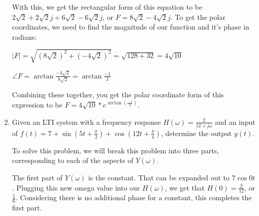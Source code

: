 \documentclass[12pt,letterpaper, onecolumn]{exam}
\begin{document}
\begin{enumerate}
        With this, we get the rectangular form of this equation to be \begin{math}
            2\sqrt{2} + 2\sqrt{2}j + 6\sqrt{2} - 6\sqrt{2}j
        \end{math}, or \begin{math}
            F = 8\sqrt{2} - 4\sqrt{2}j
        \end{math}. To get the polar coordinates, we need to find the magnitude of our function and it's phase in radians:
        \begin{center}\begin{math}
            |F| = \sqrt{(8\sqrt{2})^2+(-4\sqrt{2})^2} = \sqrt{128 + 32} = 4\sqrt{10}
        \end{math}\end{center}
        \begin{center}\begin{math}
            \angle F = \arctan{\frac{-4\sqrt{2}}{8\sqrt{2}}} = \arctan{\frac{-1}{2}}
        \end{math}\end{center}

        Combining these together, you get the polar coordinate form of this expression to be \begin{math}F = 4\sqrt{10}*e^{\arctan{(\frac{-1}{2})} }\end{math}.


    \item {Given an LTI system with a frequency response \begin{math}
        H(\omega) = \frac{2}{12 + j\omega}
    \end{math} and an input of \begin{math}
        f(t) = 7 + \sin{(5t + \frac{\pi}{2})} + \cos{(12t + \frac{\pi}{4})}
    \end{math}, determine the output \begin{math}y(t)\end{math}.\\}

        To solve this problem, we will break this problem into three parts, corresponding to each of the aspects of \begin{math}Y(\omega)\end{math}.

        The first part of \begin{math}Y(\omega)\end{math} is the constant. That can be expanded out to \begin{math}7\cos{0t}\end{math}. Plugging this new omega value into our \begin{math}H(\omega)\end{math}, we get that \begin{math}H(0) = \frac{2}{12}\end{math}, or \begin{math}\frac{1}{6}\end{math}. Considering there is no additional phase for a constant, this completes the first part.


\end{enumerate}
\end{document}
